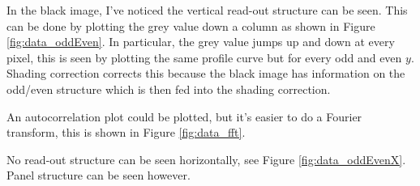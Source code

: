 In the black image, I've noticed the vertical read-out structure can be seen. This can be done by plotting the grey value down a column as shown in Figure \ref{fig:data_oddEven}. In particular, the grey value jumps up and down at every pixel, this is seen by plotting the same profile curve but for every odd and even $y$. Shading correction corrects this because the black image has information on the odd/even structure which is then fed into the shading correction.

An autocorrelation plot could be plotted, but it's easier to do a Fourier transform, this is shown in Figure \ref{fig:data_fft}.

No read-out structure can be seen horizontally, see Figure \ref{fig:data_oddEvenX}. Panel structure can be seen however.



